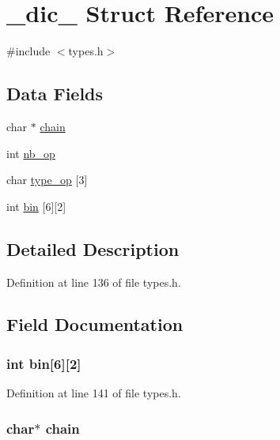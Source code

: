 \hypertarget{struct__dic__}{\section{\-\_\-dic\-\_\- Struct Reference}
\label{struct__dic__}
}


{\ttfamily \#include $<$types.\-h$>$}

\subsection*{Data Fields}
\begin{DoxyCompactItemize}
\item 
char $\ast$ \hyperlink{struct__dic___a1a2e600921a838625caf6c28eb97240c}{chain}
\item 
int \hyperlink{struct__dic___a88a29c0db6a919d126d1c94d573dd711}{nb\-\_\-op}
\item 
char \hyperlink{struct__dic___ae12e6412760866fc84c44da4df21f495}{type\-\_\-op} \mbox{[}3\mbox{]}
\item 
int \hyperlink{struct__dic___afb2fc3699e73c83cf83f2b9059767f64}{bin} \mbox{[}6\mbox{]}\mbox{[}2\mbox{]}
\end{DoxyCompactItemize}


\subsection{Detailed Description}


Definition at line 136 of file types.\-h.



\subsection{Field Documentation}
\hypertarget{struct__dic___afb2fc3699e73c83cf83f2b9059767f64}{
\subsubsection[{bin}]{\setlength{\rightskip}{0pt plus 5cm}int bin\mbox{[}6\mbox{]}\mbox{[}2\mbox{]}}}\label{struct__dic___afb2fc3699e73c83cf83f2b9059767f64}


Definition at line 141 of file types.\-h.

\hypertarget{struct__dic___a1a2e600921a838625caf6c28eb97240c}{
\subsubsection[{chain}]{\setlength{\rightskip}{0pt plus 5cm}char$\ast$ chain}}\label{struct__dic___a1a2e600921a838625caf6c28eb97240c}


